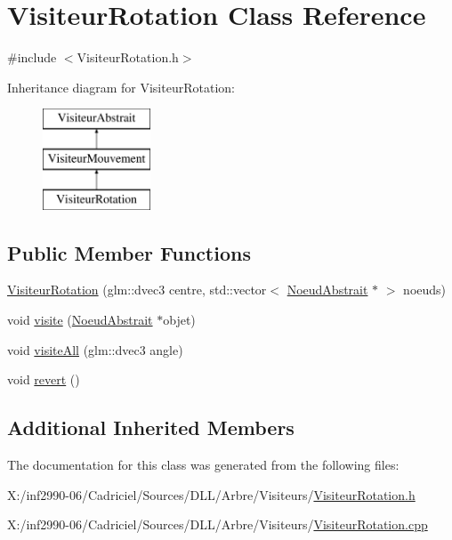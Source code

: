 \hypertarget{class_visiteur_rotation}{\section{Visiteur\-Rotation Class Reference}
\label{class_visiteur_rotation}
}


{\ttfamily \#include $<$Visiteur\-Rotation.\-h$>$}

Inheritance diagram for Visiteur\-Rotation\-:\begin{figure}[H]
\begin{center}
\leavevmode
\includegraphics[height=3.000000cm]{class_visiteur_rotation}
\end{center}
\end{figure}
\subsection*{Public Member Functions}
\begin{DoxyCompactItemize}
\item 
\hyperlink{group__inf2990_gad5d3f71aa945a9f387ae2c62ec1d5026}{Visiteur\-Rotation} (glm\-::dvec3 centre, std\-::vector$<$ \hyperlink{class_noeud_abstrait}{Noeud\-Abstrait} $\ast$ $>$ noeuds)
\item 
void \hyperlink{group__inf2990_gab3678c4f238778882553b03a4eed5fdb}{visite} (\hyperlink{class_noeud_abstrait}{Noeud\-Abstrait} $\ast$objet)
\item 
void \hyperlink{group__inf2990_gaea2e5737606a5ef316849a6357dd0833}{visite\-All} (glm\-::dvec3 angle)
\item 
void \hyperlink{group__inf2990_ga00654a07e13ff8cb214b7ca0328ccbae}{revert} ()
\end{DoxyCompactItemize}
\subsection*{Additional Inherited Members}


The documentation for this class was generated from the following files\-:\begin{DoxyCompactItemize}
\item 
X\-:/inf2990-\/06/\-Cadriciel/\-Sources/\-D\-L\-L/\-Arbre/\-Visiteurs/\hyperlink{_visiteur_rotation_8h}{Visiteur\-Rotation.\-h}\item 
X\-:/inf2990-\/06/\-Cadriciel/\-Sources/\-D\-L\-L/\-Arbre/\-Visiteurs/\hyperlink{_visiteur_rotation_8cpp}{Visiteur\-Rotation.\-cpp}\end{DoxyCompactItemize}
